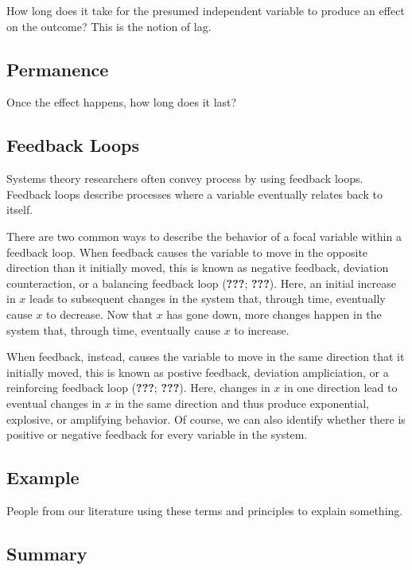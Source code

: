 \documentclass[english,,man]{apa6}
\theoremstyle{definition}
\theoremstyle{definition}
\theoremstyle{definition}
\theoremstyle{remark}
\begin{document}
How long does it take for the presumed independent variable to produce
an effect on the outcome? This is the notion of lag.

\hypertarget{permanence}{%
\subsection{Permanence}\label{permanence}}

Once the effect happens, how long does it last?

\hypertarget{feedback-loops}{%
\subsection{Feedback Loops}\label{feedback-loops}}

Systems theory researchers often convey process by using feedback loops.
Feedback loops describe processes where a variable eventually relates
back to itself.

There are two common ways to describe the behavior of a focal variable
within a feedback loop. When feedback causes the variable to move in the
opposite direction than it initially moved, this is known as negative
feedback, deviation counteraction, or a balancing feedback loop
({\textbf{???}}; {\textbf{???}}). Here, an initial increase in \(x\)
leads to subsequent changes in the system that, through time, eventually
cause \(x\) to decrease. Now that \(x\) has gone down, more changes
happen in the system that, through time, eventually cause \(x\) to
increase.

When feedback, instead, causes the variable to move in the same
direction that it initially moved, this is known as postive feedback,
deviation ampliciation, or a reinforcing feedback loop ({\textbf{???}};
{\textbf{???}}). Here, changes in \(x\) in one direction lead to
eventual changes in \(x\) in the same direction and thus produce
exponential, explosive, or amplifying behavior. Of course, we can also
identify whether there is positive or negative feedback for every
variable in the system.

\hypertarget{example}{%
\subsection{Example}\label{example}}

People from our literature using these terms and principles to explain
something.

\hypertarget{summary}{%
\subsection{Summary}\label{summary}}
\end{document}
